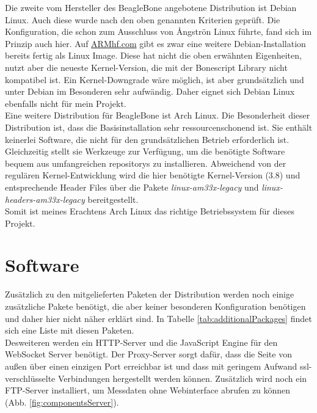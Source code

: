 Die zweite vom Hersteller des BeagleBone angebotene Distribution ist Debian Linux. Auch diese wurde nach den oben genannten Kriterien geprüft. Die Konfiguration, die schon zum Ausschluss von {\AA}ngströn Linux führte, fand sich im Prinzip auch hier. Auf \href{http://www.armhf.com/}{ARMhf.com} gibt es zwar eine weitere Debian-Installation bereits fertig als Linux Image. Diese hat nicht die oben erwähnten Eigenheiten, nutzt aber die neueste Kernel-Version, die mit der Bonescript Library nicht kompatibel ist. Ein Kernel-Downgrade wäre möglich, ist aber grundsätzlich und unter Debian im Besonderen sehr aufwändig. Daher eignet sich Debian Linux ebenfalls nicht für mein Projekt.\\

Eine weitere Distribution für BeagleBone ist Arch Linux. Die Besonderheit dieser Distribution ist, dass die Basisinstallation sehr ressourcenschonend ist. Sie enthält keinerlei Software, die nicht für den grundsätzlichen Betrieb erforderlich ist. Gleichzeitig stellt sie Werkzeuge zur Verfügung, um die benötigte Software bequem aus umfangreichen \glspl{repository} zu installieren. Abweichend von der regulären Kernel-Entwicklung wird die hier benötigte Kernel-Version (3.8) und entsprechende Header Files über die Pakete \textit{linux-am33x-legacy} und \textit{linux-headers-am33x-legacy} bereitgestellt.\\

Somit ist meines Erachtens Arch Linux das richtige Betriebssystem für dieses Projekt.


\section{Software}

Zusätzlich zu den mitgelieferten Paketen der Distribution werden noch einige zusätzliche Pakete benötigt, die aber keiner besonderen Konfiguration benötigen und daher hier nicht näher erklärt sind. In Tabelle \ref{tab:additionalPackages} findet sich eine Liste mit diesen Paketen.\\

Desweiteren werden ein HTTP-Server und die JavaScript Engine für den WebSocket Server benötigt. Der Proxy-Server sorgt dafür, dass die Seite von außen über einen einzigen Port erreichbar ist und dass mit geringem Aufwand \gls{ssl}-verschlüsselte Verbindungen hergestellt werden können. Zusätzlich wird noch ein FTP-Server installiert, um Messdaten ohne Webinterface abrufen zu können (Abb. \ref{fig:componentsServer}).

